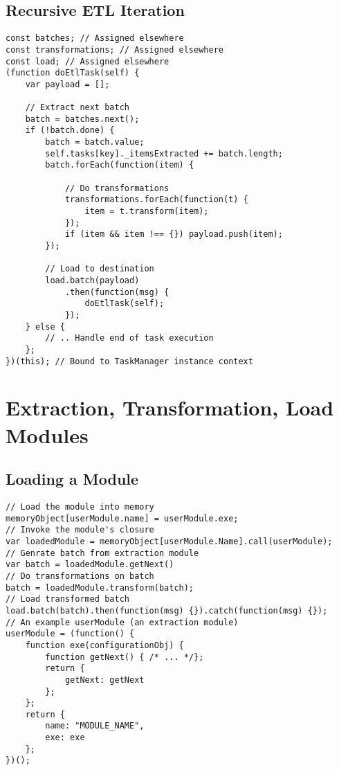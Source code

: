 \subsection{Recursive ETL Iteration}
\label{netl-recursive-iterator}
\begin{verbatim}
const batches; // Assigned elsewhere
const transformations; // Assigned elsewhere
const load; // Assigned elsewhere
(function doEtlTask(self) {
    var payload = [];

    // Extract next batch
    batch = batches.next();
    if (!batch.done) {
        batch = batch.value;
        self.tasks[key]._itemsExtracted += batch.length;
        batch.forEach(function(item) {

            // Do transformations
            transformations.forEach(function(t) {
                item = t.transform(item);
            });
            if (item && item !== {}) payload.push(item);
        });

        // Load to destination
        load.batch(payload)
            .then(function(msg) {
                doEtlTask(self);
            });
    } else {
        // .. Handle end of task execution
    };
})(this); // Bound to TaskManager instance context
\end{verbatim}

\section{Extraction, Transformation, Load Modules}
\label{netl-modules}

\subsection{Loading a Module}
\label{netl-module-loading}
\begin{verbatim}
// Load the module into memory
memoryObject[userModule.name] = userModule.exe;
// Invoke the module's closure
var loadedModule = memoryObject[userModule.Name].call(userModule);
// Genrate batch from extraction module
var batch = loadedModule.getNext()
// Do transformations on batch
batch = loadedModule.transform(batch);
// Load transformed batch
load.batch(batch).then(function(msg) {}).catch(function(msg) {});
// An example userModule (an extraction module)
userModule = (function() {
    function exe(configurationObj) {
        function getNext() { /* ... */};
        return {
            getNext: getNext
        };
    };
    return {
        name: "MODULE_NAME",
        exe: exe
    };
})();
\end{verbatim}


